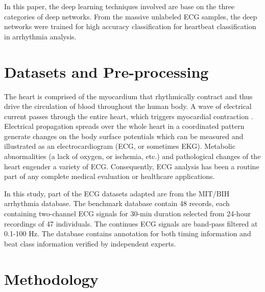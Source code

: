 \documentclass[journal]{IEEEtran}
\begin{document}
In this paper, the deep learning techniques involved are base on the three categories of deep networks. 
From the massive unlabeled ECG samples, the deep networks were trained for high accuracy classification for heartbeat classification in arrhythmia analysis.

\section{Datasets and Pre-processing}
The heart is comprised of the myocardium that rhythmically contract and thus drive the circulation of blood throughout the human body. 
A wave of electrical current passes through the entire heart, which triggers myocardial contraction \cite{clifford2006}. 
Electrical propagation spreads over the whole heart in a coordinated pattern generate changes on the body surface potentials which can be measured and illustrated as an electrocardiogram (ECG, or sometimes EKG). 
Metabolic abnormalities (a lack of oxygen, or ischemia, etc.) and pathological changes of the heart engender a variety of ECG. 
Consequently, ECG analysis has been a routine part of any complete medical evaluation or healthcare applications.

In this study, part of the ECG datasets adapted are from the MIT/BIH arrhythmia database. 
The benchmark database contain 48 records, each containing two-channel ECG signals for 30-min duration selected from 24-hour recordings of 47 individuals. 
The continues ECG signals are band-pass filtered at 0.1-100 Hz.
The database contains annotation for both timing information and beat class information verified by independent experts.

\section{Methodology}
\end{document}
